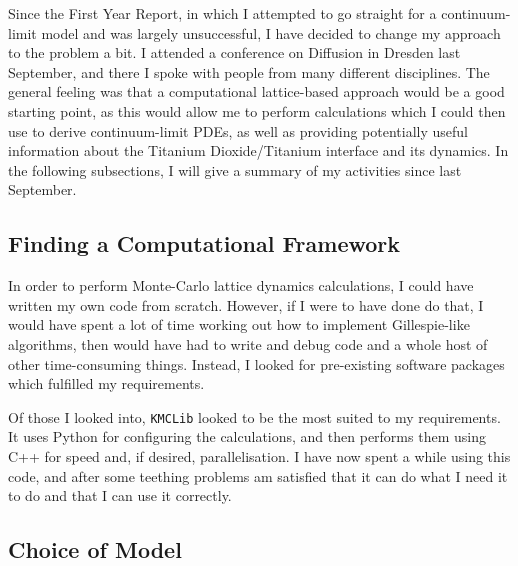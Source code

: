 Since the First Year Report, in which I attempted to go straight for a continuum-limit model and was largely unsuccessful, I have decided to change my approach to the problem a bit.
I attended a conference on Diffusion in Dresden last September, and there I spoke with people from many different disciplines. The general feeling was that a computational lattice-based approach
would be a good starting point, as this would allow me to perform calculations which I could then use to derive continuum-limit PDEs, as well as providing potentially useful information about the Titanium
Dioxide/Titanium interface and its dynamics. In the following subsections, I will give a summary of my activities since last September.

\subsection{Finding a Computational Framework}

In order to perform Monte-Carlo lattice dynamics calculations, I could have written my own code from scratch. However, if I were to have done do that, I would have spent a lot of time working out how to implement
Gillespie-like algorithms, then would have had to write and debug code and a whole host of other time-consuming things. Instead, I looked for pre-existing software packages which fulfilled my requirements.

Of those I looked into, \texttt{KMCLib}\cite{leetmaa2014kmclib} looked to be the most suited to my requirements. It uses Python for configuring the calculations, and then performs them using C++ for speed
and, if desired, parallelisation. I have now spent a while using this code, and after some teething problems am satisfied that it can do what I need it to do and that I can use it correctly.

\subsection{Choice of Model}
\label{sec: modelChoice}

